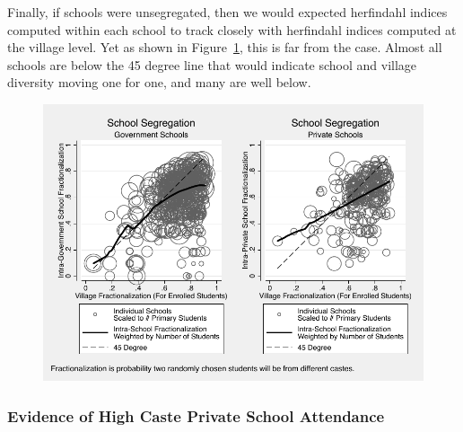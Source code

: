 \documentclass[Eubank_pk_ethnic_sorting.tex]{subfiles}
\begin{document}
Finally, if schools were unsegregated, then we would expected herfindahl indices computed within each school to track closely with herfindahl indices computed at the village level. Yet as shown in Figure~\ref{schoolvvillageherf}, this is far from the case. Almost all schools are below the 45 degree line that would indicate school and village diversity moving one for one, and many are well below.

\begin{figure}[H]
	\begin{center}
	\caption{}\label{schoolvvillageherf}
	\includegraphics[scale=1.0]{../graphs/intra_versus_intervillage_frac_combined.pdf}
	\end{center}
\end{figure}

\subsubsection{Evidence of High Caste Private School Attendance}
\end{document}
